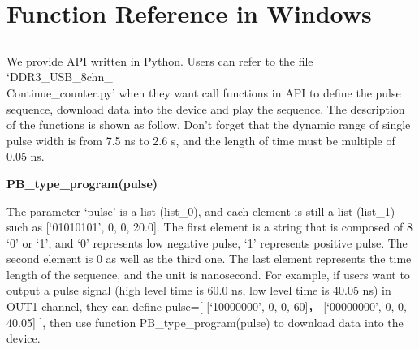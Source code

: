 \chapter{\heiti Function Reference in Windows}
\section{}
\hspace{-0.2cm}We provide API written in Python. Users can refer to the file `DDR3\_USB\_8chn\_\\
Continue\_counter.py' when they want call functions in API to define the pulse sequence, download data into the device and play the sequence. The description of the functions is shown as follow. Don't forget that the dynamic range of single pulse width is from 7.5 ns to 2.6 s, and the length of time must be multiple of  0.05 ns.
\vspace{0.4cm}

\noindent\fontsize{12pt}{\baselineskip}\textbf{PB\_type\_program(pulse)}

\hspace{-0.2cm}The parameter `pulse' is a list (list\_0), and each element is still a list (list\_1) such as [`01010101', { }0, { }0, { }20.0]. The first element is a string that is composed of  8 `0' or `1', and `0' represents low negative pulse, `1' represents positive pulse. The second element is 0 as well as the third one. The last element represents the time length of the sequence, and the unit is nanosecond. For example, if users want to output a pulse signal (high level time is 60.0 ns, low level time is 40.05 ns) in OUT1 channel, they can define pulse=[{ }[`10000000', { }0, { }0, { }60]， [`00000000', { }0, { }0, { }40.05]{ }], then use function PB\_type\_program(pulse) to download data into the device.
\vspace{0.4cm}


